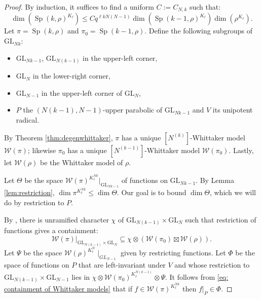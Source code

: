 \documentclass{amsart}
\newcommand{\mc}[1]{\mathcal{#1}}
\newcommand{\GL}{\mathrm{GL}}
\newcommand{\1}{\m 1}
\DeclareMathOperator{\Speh}{\mathrm{Sp}}
\theoremstyle{remark}
\theoremstyle{definition}
\numberwithin{equation}{subsection}
\newcommand{\blue}[1]{\textcolor{blue}{#1}}
\begin{document}
\begin{proof}
By induction, it suffices to find a uniform $C := C_{N,k}$ such that:
\[
\dim(\Speh(k, \rho)^{K_\ell}) \leq C q^{\ell kN(N-1)} \dim(\Speh(k-1, \rho)^{K_\ell}) \dim(\rho^{K_\ell}). 
\] %
Let $\pi = \Speh(k, \rho)$ and $\pi_0 = \Speh(k-1,\rho)$. Define the following subgroups of $\GL_{Nk}$:
\begin{itemize}
    \item $\GL_{Nk-1}$, $\GL_{N(k-1)}$ in the upper-left corner,
    \item $\GL_N$ in the lower-right corner,
    \item $\GL_{N-1}$ in the upper-left corner of $\GL_N$,
    \item $P$ the $(N(k-1), N-1)$-upper parabolic of $\GL_{Nk-1}$ and $V$ its unipotent radical. 
\end{itemize} 
By Theorem \ref{thm:degenwhittaker}, $\pi$ has a unique $[N^{(k)}]$-Whittaker model $\mc W(\pi)$; likewise $\pi_0$ has a unique $[N^{(k-1)}]$-Whittaker model $\mc W(\pi_0)$. Lastly, let $\mc W(\rho)$ be the Whittaker model of $\rho$. 

Let $\Theta$ be the space $\mc W(\pi)^{K^{Nk}_\ell}|_{\GL_{Nk-1}}$ of functions on $\GL_{Nk-1}$. By Lemma \ref{lem:restriction}, $\dim \pi^{K_\ell^{Nk}} \leq \dim \Theta$. Our goal is to bound $\dim \Theta$, which we will do by restriction to $P$.


By \cite[(3a)]{LM20}, there is unramified character $\chi$ of $\GL_{N(k-1)} \times \GL_N$ such that restriction of functions gives a containment:
\begin{equation} 
\label{eq: containment of Whittaker models}
\mc W(\pi)|_{\GL_{N(k-1)} \times \GL_N} \subseteq \chi \otimes (\mc W(\pi_0) \boxtimes \mc W(\rho)). 
\end{equation}
Let $\Psi$ be the space $\mc W(\rho)^{K_\ell^N}\mid_{GL_{N-1}}$ given by restricting functions. Let $\Phi$ be the space of functions on $P$ that are left-invariant under $V$ and whose restriction to $\GL_{N(k-1)}\times \GL_{N-1}$ lies in $\chi \otimes \mc W(\pi_0)^{K_\ell^{N(k-1)}}\otimes \Psi$. It follows from \eqref{eq: containment of Whittaker models} that if $f \in \mc W(\pi)^{K_\ell^{Nk}}$ then $f|_P \in \Phi$. 


\end{proof}
\end{document}
